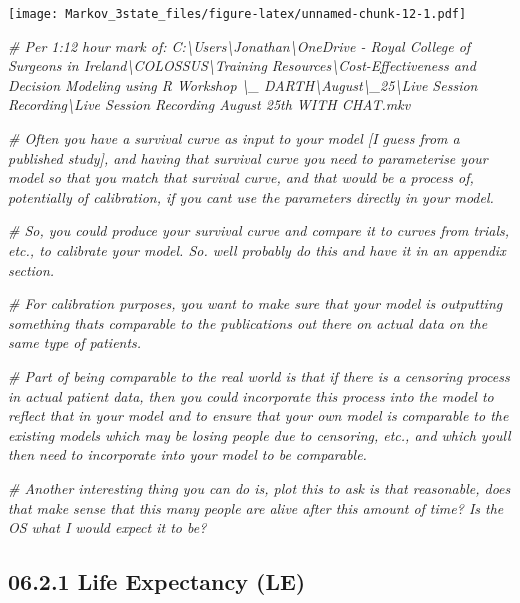 \documentclass[
]{article}
\newenvironment{Shaded}{\begin{snugshade}}{\end{snugshade}}
\newcommand{\CommentTok}[1]{\textcolor[rgb]{0.56,0.35,0.01}{\textit{#1}}}
\begin{document}
\texttt{[image: Markov\_3state\_files/figure-latex/unnamed-chunk-12-1.pdf]}

\begin{Shaded}
\begin{Highlighting}[]
\CommentTok{\# Per 1:12 hour mark of: C:\textbackslash{}Users\textbackslash{}Jonathan\textbackslash{}OneDrive {-} Royal College of Surgeons in Ireland\textbackslash{}COLOSSUS\textbackslash{}Training Resources\textbackslash{}Cost{-}Effectiveness and Decision Modeling using R Workshop \textbackslash{}\_ DARTH\textbackslash{}August\textbackslash{}\_25\textbackslash{}Live Session Recording\textbackslash{}Live Session Recording August 25th WITH CHAT.mkv}

\CommentTok{\# Often you have a survival curve as input to your model [I guess from a published study], and having that survival curve you need to parameterise your model so that you match that survival curve, and that would be a process of, potentially of calibration, if you can\textquotesingle{}t use the parameters directly in your model.}

\CommentTok{\# So, you could produce your survival curve and compare it to curves from trials, etc., to calibrate your model. So. we\textquotesingle{}ll probably do this and have it in an appendix section.}

\CommentTok{\# For calibration purposes, you want to make sure that your model is outputting something that\textquotesingle{}s comparable to the publications out there on actual data on the same type of patients.}

\CommentTok{\# Part of being comparable to the real world is that if there is a censoring process in actual patient data, then you could incorporate this process into the model to reflect that in your model and to ensure that your own model is comparable to the existing models which may be losing people due to censoring, etc., and which you\textquotesingle{}ll then need to incorporate into your model to be comparable. }


\CommentTok{\# Another interesting thing you can do is, plot this to ask is that reasonable, does that make sense that this many people are alive after this amount of time? Is the OS what I would expect it to be?}
\end{Highlighting}
\end{Shaded}

\hypertarget{life-expectancy-le}{%
\subsection{06.2.1 Life Expectancy (LE)}\label{life-expectancy-le}}
\end{document}
